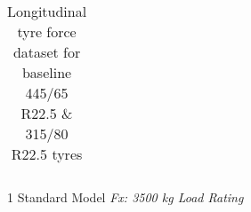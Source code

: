 \begin{table}[H]
\begin{threeparttable}
\begin{tabulary}{\textwidth}{|c|c|c|c|c|c|}
		\end{tabulary}

		\caption{Longitudinal tyre force dataset for baseline 445/65 R22.5 \& 315/80 R22.5 tyres }
		\label{table:long-tyre-force-fx-3500-kg}

		\begin{tablenotes}
		\item[1] Standard \trucksim{} Model \textit{Fx: 3500 kg Load Rating}
		\end{tablenotes}

	\end{threeparttable}
\end{table}

